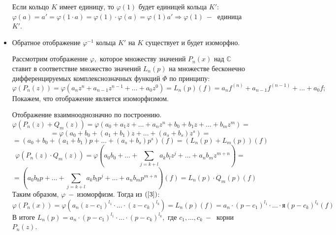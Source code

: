\begin{itemize}
    Если кольцо $K$ имеет единицу, то $\varphi(1)$ будет единицей кольца $K'$: $\varphi(a)=a'=\varphi(1\cdot a )= \varphi(1)\cdot \varphi(a) = \varphi(1) a'\Rightarrow\varphi(1)~-~$ единица $K'$.
    \item Обратное отображение $\varphi^{-1}$ кольца $K'$ на $K$ существует и будет изоморфно.\par
    Рассмотрим отображение $\varphi,$ которое множеству значений $P_n(x)$ над $\mathds{C}$ ставит в соответствие множество значений $L_n(p)$ на множестве бесконечно дифференцируемых комплекснозначных функций $\varPhi$ по принципу:
    $$\varphi(P_n(z))=\varphi(a_nz^n+a_{n-1}z^{n-1}+\dots+a_0z^0)=L_n(p)(f)=a_nf^{(n)}+a_{n-1}f^{(n-1)}+\dots+a_0f;$$
    Покажем, что отображение является изоморфизмом.\par Отображение взаимнооднозначно по построению.
    $$\varphi(P_n(z)+Q_m(z))=\varphi(a_0+a_1z+\dots+a_nz^n+b_0+b_1z+\dots+b_mz^m)=$$
    $$=\varphi(a_0+b_0+(a_1+b_1)z+\dots+(a_s+b_s)z^s)=$$
    $$=(a_0+b_0+(a_1+b_1)p+\dots+(a_s+b_s)p^s)(f)=(L_n(p)+L_m(p))(f)$$
    $$\varphi(P_n(z)\cdot Q_m(z))=\varphi(a_0b_0+\dots+ \displaystyle\sum_{j=k+l}a_kb_lz^j+\dots+a_nb_mz^{m+n})=$$
    $$=(a_0b_0p+\dots+\displaystyle\sum_{j=k+l}a_kb_lp^j+\dots+a_nb_mp^{m+n})(f)=L_n(p)\cdot Q_m(p)(f)$$
    Таким образом, $\varphi~-~$изоморфизм. Тогда из $(\ref{3})$: $$\varphi(P_n(x))=\varphi(a_n(z-c_1)^{l_1}\cdot ...\cdot (z-c_k)^{l_k})= L_n(p)(f)=a_n\cdot (p-c_1)^{l_1}\cdot ... \cdot я(p-c_k)^{l_k}(f)$$
    В итоге  $L_n(p)=a_n\cdot (p-c_1)^{l_1}\cdot ... \cdot (p-c_k)^{l_k},$ где $c_1, \dots, c_k ~-~$ корни $P_n(z)$.
    
\end{itemize}
